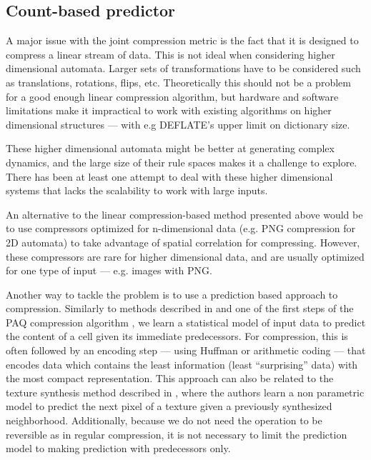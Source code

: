 \subsection{Count-based predictor}\label{sec:count-based-pred}

A major issue with the joint compression metric is the fact that it is designed
to compress a linear stream of data. This is not ideal when considering higher
dimensional automata. Larger sets of transformations have to be
considered such as translations, rotations, flips, etc. Theoretically this
should not be a problem for a good enough linear compression algorithm, but
hardware and software limitations make it impractical to work with existing
algorithms on higher dimensional structures --- with e.g DEFLATE's upper limit
on dictionary size.

These higher dimensional automata might be better at generating complex
dynamics, and the large size of their rule spaces makes it a challenge to
explore. There has been at least one attempt to deal with these higher
dimensional systems \parencite{zenilTwodimensionalKolmogorovComplexity2015} that lacks the scalability
to work with large inputs.

An alternative to the linear compression-based method presented above would be
to use compressors optimized for n-dimensional data (e.g. PNG compression for 2D
automata) to take advantage of spatial correlation for compressing. However,
these compressors are rare for higher dimensional data, and are usually
optimized for one type of input --- e.g. images with PNG.

Another way to tackle the problem is to use a prediction based approach to
compression. Similarly to methods described in
\parencite{schmidhuberSequentialNeuralText1996} and one of the first steps of the PAQ
compression algorithm \parencite{mahoneyFastTextCompression2000}, we learn a statistical model of
input data to predict the content of a cell given its immediate predecessors.
For compression, this is often followed by an encoding step --- using Huffman or
arithmetic coding --- that encodes data which contains the least information
(least ``surprising'' data) with the most compact representation. This approach
can also be related to the texture synthesis method described in
\parencite{efrosTextureSynthesisNonparametric1999}, where the authors learn a non parametric model to
predict the next pixel of a texture given a previously synthesized neighborhood.
Additionally, because we do not need the operation to be reversible as in regular
compression, it is not necessary to limit the prediction model to making
prediction with predecessors only.

